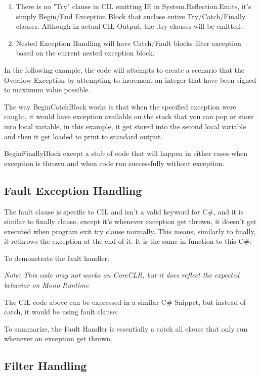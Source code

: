 \begin{enumerate}
\item There is no "Try" clause in CIL emitting IE in System.Reflection.Emits, it's simply Begin/End Exception Block that enclose entire Try/Catch/Finally clauses. Although in actual CIL Output, the .try clauses will be emitted.
\item Nested Exception Handling will have Catch/Fault blocks filter exception based on the current nested exception block.
\end{enumerate}

In the following example, the code will attempts to create a scenario that the Overflow Exception by attempting to increment an integer that have been signed to maximum value possible.



The way BeginCatchBlock works is that when the specified exception were caught, it would have exception available on the stack that you can pop or store into local variable, in this example, it get stored into the second local variable and then it get loaded to print to standard output.

BeginFinallyBlock except a stub of code that will happen in either cases when exception is thrown and when code run successfully without exception.

\newpage

\subsection{Fault Exception Handling}
The fault clause is specific to CIL and isn't a valid keyword for C\#, and it is similar to finally clause, except it's whenever exception get thrown, it doesn't get executed when program exit try clause normally. This means, similarly to finally, it rethrows the exception at the end of it. It is the same in function to this C\#:

To demonstrate the fault handler:



\textit{Note: This code may not works on CoreCLR, but it does reflect the expected behavior on Mono Runtime}

\newpage
The CIL code above can be expressed in a similar C\# Snippet, but instead of catch, it would be using fault clause:



To summarize, the Fault Handler is essentially a catch all clause that only run whenever an exception get thrown.

\subsection{Filter Handling}
